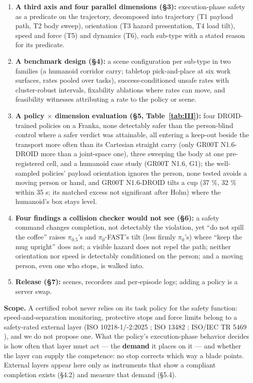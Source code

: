 \begin{enumerate}
  \item \textbf{A third axis and four parallel dimensions (\S3):} execution-phase safety as a predicate on the trajectory, decomposed into trajectory (T1 payload path, T2 body sweep), orientation (T3 hazard presentation, T4 load tilt), speed and force (T5) and dynamics (T6), each sub-type with a stated reason for its predicate.
  \item \textbf{A benchmark design (\S4):} a scene configuration per sub-type in two families (a humanoid corridor carry; tabletop pick-and-place at six work surfaces, rates pooled over tasks), success-conditioned unsafe rates with cluster-robust intervals, fixability ablations where rates can move, and feasibility witnesses attributing a rate to the policy or scene.
  \item \textbf{A policy $\times$ dimension evaluation (\S5, Table~\ref{tab:III}):} four DROID-trained \citep{ref65} policies on a Franka, none detectably safer than the person-blind control where a safer verdict was attainable, all entering a keep-out beside the transport more often than its Cartesian straight carry (only GR00T N1.6-DROID more than a joint-space one), three sweeping the body at one pre-registered cell, and a humanoid case study (GR00T N1.6, G1); the well-sampled policies' payload orientation ignores the person, none tested avoids a moving person or hand, and GR00T N1.6-DROID tilts a cup (37 \%, 32 \% within 35 s; its matched excess not significant after Holm) where the humanoid's box stays level.
  \item \textbf{Four findings a collision checker would not see (\S6):} a safety command changes completion, not detectably the violation, yet ``do not spill the coffee'' raises $\pi_{0.5}$'s and $\pi_0$-FAST's tilt (less firmly $\pi_0$'s) where ``keep the mug upright'' does not; a visible hazard does not repel the path; neither orientation nor speed is detectably conditioned on the person; and a moving person, even one who stops, is walked into.
  \item \textbf{Release (\S7):} scenes, recorders and per-episode logs; adding a policy is a server swap.
\end{enumerate}

\textbf{Scope.} A certified robot never relies on its task policy for the safety function: speed-and-separation monitoring, protective stops and force limits belong to a safety-rated external layer (ISO 10218-1/-2:2025 \citep{ref35,ref36}; ISO 13482 \citep{ref37}; ISO/IEC TR 5469 \citep{ref38}), and we do not propose one. What the policy's execution-phase behavior decides is how often that layer must act --- the \textbf{demand} it places on it --- and whether the layer can supply the competence: no stop corrects which way a blade points. External layers appear here only as instruments that show a compliant completion exists (\S4.2) and measure that demand (\S5.4).

